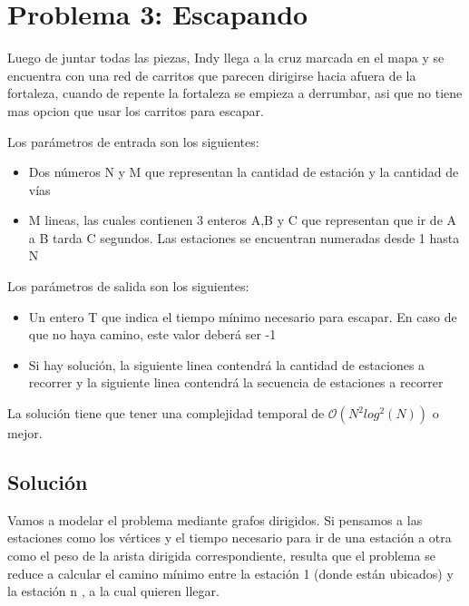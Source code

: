 \section{Problema 3: Escapando}

Luego de juntar todas las piezas, Indy llega a la cruz marcada en el mapa y se encuentra con una red de carritos que parecen dirigirse hacia afuera de la fortaleza, cuando de repente la fortaleza se empieza a derrumbar, asi que no tiene mas opcion que usar los carritos para escapar.

Los parámetros de entrada son los siguientes:

		\begin{itemize}
		\item Dos números N y M que representan la cantidad de estación y la cantidad de vías
		\item M lineas, las cuales contienen 3 enteros A,B y C que representan que ir de A a B tarda C segundos. Las estaciones se encuentran numeradas desde 1 hasta N
    		\end{itemize}

Los parámetros de salida son los siguientes:

	\begin{itemize}
	\item Un entero T que indica el tiempo mínimo necesario para escapar. En caso de que no haya camino, este valor deberá ser -1
	\item Si hay solución, la siguiente linea contendrá la cantidad de estaciones a recorrer y la siguiente linea contendrá la secuencia de estaciones a recorrer
	\end{itemize}

La solución tiene que tener una complejidad temporal de $\mathcal{O}(N^{2}log^{2}(N))$ o mejor.

\subsection{Solución}

Vamos a modelar el problema mediante grafos dirigidos. Si pensamos a las estaciones como los vértices y el tiempo necesario para ir de una estación a otra como el peso de la arista dirigida correspondiente, resulta que el problema se reduce a calcular el camino mínimo entre la estación 1 (donde están ubicados) y la estación n , a la cual quieren llegar.

